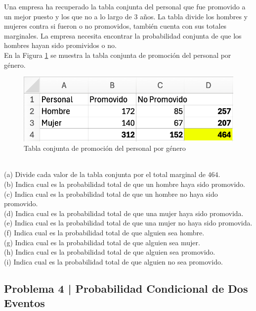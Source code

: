 \documentclass{article}
\begin{document}
Una empresa ha recuperado la tabla conjunta del personal que fue promovido a un mejor puesto y los que no a lo largo de 3 años. La tabla divide los hombres y mujeres contra si fueron o no promovidos, también cuenta con sus totales marginales. La empresa necesita encontrar la probabilidad conjunta de que los hombres hayan sido promividos o no.
\\[12pt]
En la Figura \ref{fig:p203} se muestra la tabla conjunta de promoción del personal por género.
\begin{figure}[!ht]
    \centering
    \begin{minipage}{\textwidth}
        \centering
        \includegraphics[width=\textwidth]{figures/p203.png}
    \end{minipage}
    \captionsetup{width=0.9\textwidth}
    \caption{Tabla conjunta de promoción del personal por género}
    \label{fig:p203}
\end{figure}
\\
(a) Divide cada valor de la tabla conjunta por el total marginal de $464$.
\\[6pt]
(b) Indica cual es la probabilidad total de que un hombre haya sido promovido.
\\[6pt]
(c) Indica cual es la probabilidad total de que un hombre no haya sido promovido.
\\[6pt]
(d) Indica cual es la probabilidad total de que una mujer haya sido promovida.
\\[6pt]
(e) Indica cual es la probabilidad total de que una mujer no haya sido promovida.
\\[6pt]
(f) Indica cual es la probabilidad total de que alguien sea hombre.
\\[6pt]
(g) Indica cual es la probabilidad total de que alguien sea mujer.
\\[6pt]
(h) Indica cual es la probabilidad total de que alguien sea promovido.
\\[6pt]
(i) Indica cual es la probabilidad total de que alguien no sea promovido.

\clearpage

\subsection*{Problema 4 | Probabilidad Condicional de Dos Eventos}
\end{document}
